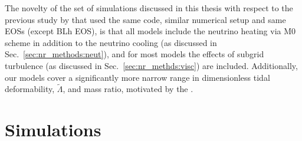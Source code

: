 
%


The novelty of the set of simulations discussed in this thesis with respect to the 
previous study by \citet{Radice:2018pdn} that used the same code,
similar numerical setup 
and same \acp{EOS} (except BLh \ac{EOS}), is that all models include the neutrino heating via 
M0 scheme in addition to the neutrino cooling 
(as discussed in Sec.~\ref{sec:nr_methods:neut}), 
and for most models the effects of subgrid turbulence 
(as discussed in Sec.~\ref{sec:nr_methds:visc}) 
are included. Additionally, our models cover a significantly more narrow 
range in 
dimensionless tidal deformability, $\tilde{\Lambda}$, and mass ratio, motivated by the \GW{}.



\section{Simulations}\label{sec:bns_merg:sims}




